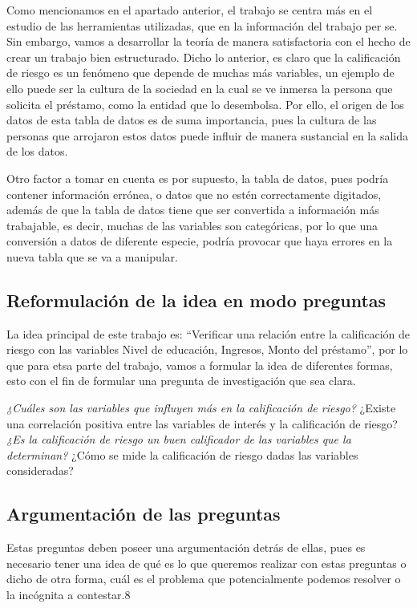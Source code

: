 \documentclass[
  letterpaper,
  DIV=11,
  numbers=noendperiod]{scrreprt}
\begin{document}
Como mencionamos en el apartado anterior, el trabajo se centra más en el
estudio de las herramientas utilizadas, que en la información del
trabajo per se. Sin embargo, vamos a desarrollar la teoría de manera
satisfactoria con el hecho de crear un trabajo bien estructurado. Dicho
lo anterior, es claro que la calificación de riesgo es un fenómeno que
depende de muchas más variables, un ejemplo de ello puede ser la cultura
de la sociedad en la cual se ve inmersa la persona que solicita el
préstamo, como la entidad que lo desembolsa. Por ello, el origen de los
datos de esta tabla de datos es de suma importancia, pues la cultura de
las personas que arrojaron estos datos puede influir de manera
sustancial en la salida de los datos.

Otro factor a tomar en cuenta es por supuesto, la tabla de datos, pues
podría contener información errónea, o datos que no estén correctamente
digitados, además de que la tabla de datos tiene que ser convertida a
información más trabajable, es decir, muchas de las variables son
categóricas, por lo que una conversión a datos de diferente especie,
podría provocar que haya errores en la nueva tabla que se va a
manipular.

\subsection{Reformulación de la idea en modo
preguntas}\label{reformulaciuxf3n-de-la-idea-en-modo-preguntas}

La idea principal de este trabajo es: ``Verificar una relación entre la
calificación de riesgo con las variables Nivel de educación, Ingresos,
Monto del préstamo'', por lo que para etsa parte del trabajo, vamos a
formular la idea de diferentes formas, esto con el fin de formular una
pregunta de investigación que sea clara.

\emph{¿Cuáles son las variables que influyen más en la calificación de
riesgo? }¿Existe una correlación positiva entre las variables de interés
y la calificación de riesgo? \emph{¿Es la calificación de riesgo un buen
calificador de las variables que la determinan? }¿Cómo se mide la
calificación de riesgo dadas las variables consideradas?

\subsection{Argumentación de las
preguntas}\label{argumentaciuxf3n-de-las-preguntas}

Estas preguntas deben poseer una argumentación detrás de ellas, pues es
necesario tener una idea de qué es lo que queremos realizar con estas
preguntas o dicho de otra forma, cuál es el problema que potencialmente
podemos resolver o la incógnita a contestar.8
\end{document}
